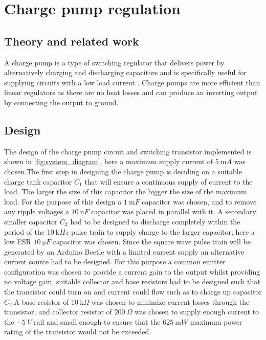 \chapter{Charge pump regulation}
\section{Theory and related work} \label{sec:literature_chargepump}
A charge pump is a type of switching regulator that delivers power by alternatively charging and discharging capacitors and is specifically useful for supplying circuits with a low load current \cite{WebsiteChargePump}. Charge pumps are more efficient than linear regulators as there are no heat losses and can produce an inverting output by connecting the output to ground.

\section{Design} \label{sec:design_chargepump}
 The design of the charge pump circuit and switching transistor implemented is shown in \ref{fig:system_diagram}, here a maximum supply current of $\SI{5}{\milli A}$ was chosen.\newline The first step in designing the charge pump is deciding on a suitable charge tank capacitor $C_1$ that will ensure a continuous supply of current to the load. The larger the size of this capacitor the bigger the size of the maximum load. For the purpose of this design a $\SI{1}{\milli F}$ capacitor was chosen, and to remove any ripple voltages a $\SI{10}{\nano F}$ capacitor was placed in parallel with it. A secondary smaller capacitor $C_2$ had to be designed to discharge completely within the period of the $\SI{10}{\kilo Hz}$ pulse train to supply charge to the larger capacitor, here a low ESR $\SI{10}{\micro F}$ capacitor was chosen.\newline
 Since the square wave pulse train will be generated by an Arduino Beetle with a limited current supply an alternative current source had to be designed. For this purpose a common emitter configuration was chosen to provide a current gain to the output whilst providing no voltage gain, suitable collector and base resistors had to be designed such that the transistor could turn on and current could flow such as to charge up capacitor $C_2$.\newline A base resistor of $\SI{10}{\kilo \Omega}$ was chosen to minimize current losses through the transistor, and collector resistor of $\SI{200}{\Omega}$ was chosen to supply enough current to the $\SI{-5}{V}$ rail and small enough to ensure that the $\SI{625}{\milli W}$ maximum power rating of the transistor would not be exceeded.
 
